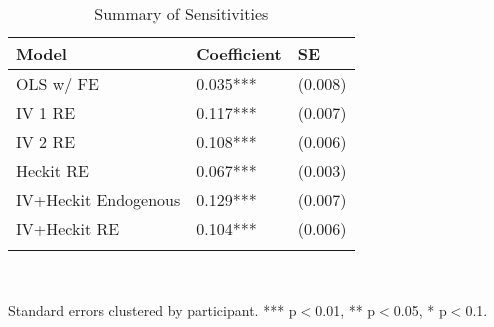 \begin{table}[h] \centering
{}

\caption{Summary of Sensitivities}
\begin{tabularx}{0.5\linewidth}{@{}lCC@{}}

\toprule
{Model}&{Coefficient}&{SE} \tabularnewline
\midrule \addlinespace[\belowrulesep]
OLS w/ FE&0.035***&(0.008) \tabularnewline
IV 1 RE&0.117***&(0.007) \tabularnewline
IV 2 RE&0.108***&(0.006) \tabularnewline
Heckit RE&0.067***&(0.003) \tabularnewline
IV+Heckit Endogenous&0.129***&(0.007) \tabularnewline
IV+Heckit RE&0.104***&(0.006) \tabularnewline
\midrule 
\bottomrule \addlinespace[\belowrulesep]

\end{tabularx}
\\ \parbox{0.5\linewidth}{\footnotesize Standard errors clustered by participant. *** p$<$0.01, ** p$<$0.05, * p$<$0.1.}
\end{table}
